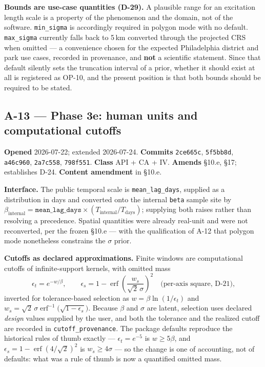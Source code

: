 \documentclass[
  10pt,
]{article}
\begin{document}
\textbf{Bounds are use-case quantities (D-29).} A plausible range for an excitation length scale is a property of the phenomenon and the domain, not of the software. \texttt{min\_sigma} is accordingly required in polygon mode with no default. \texttt{max\_sigma} currently falls back to 5\,km converted through the projected CRS when omitted --- a convenience chosen for the expected Philadelphia district and park use cases, recorded in provenance, and \textbf{not} a scientific statement. Since that default silently sets the truncation interval of a prior, whether it should exist at all is registered as OP-10, and the present position is that both bounds should be required to be stated.

\hypertarget{a-13}{%
\subsection{A-13 --- Phase 3e: human units and computational cutoffs}\label{a-13}}

\textbf{Opened} 2026-07-22; extended 2026-07-24. \textbf{Commits} \texttt{2ce665c}, \texttt{5f5bb8d}, \texttt{a46c960}, \texttt{2a7c558}, \texttt{798f551}. \textbf{Class} API + CA + IV. \textbf{Amends} §10.e, §17; establishes D-24. \textbf{Content amendment} in §10.e.

\textbf{Interface.} The public temporal scale is \texttt{mean\_lag\_days}, supplied as a distribution in days and converted onto the internal \texttt{beta} sample site by \(\beta_{\text{internal}} = \texttt{mean\_lag\_days} \times (T_{\text{internal}} / T_{\text{days}})\); supplying both raises rather than resolving a precedence. Spatial quantities were already real-unit and were not reconverted, per the frozen §10.e --- with the qualification of A-12 that polygon mode nonetheless constrains the \(\sigma\) prior.

\textbf{Cutoffs as declared approximations.} Finite windows are computational cutoffs of infinite-support kernels, with omitted mass
\[
  \epsilon_t = e^{-w/\beta},
  \qquad
  \epsilon_s = 1 - \operatorname{erf}\!\left(\frac{w_s}{\sqrt{2}\,\sigma}\right)^{\!2}
  \quad \text{(per-axis square, D-21),}
\]
inverted for tolerance-based selection as \(w = \beta \ln(1/\epsilon_t)\) and \(w_s = \sqrt{2}\,\sigma \operatorname{erf}^{-1}\!\big(\sqrt{1-\epsilon_s}\big)\). Because \(\beta\) and \(\sigma\) are latent, selection uses declared \emph{design} values supplied by the user, and both the tolerance and the realized cutoff are recorded in \texttt{cutoff\_provenance}. The package defaults reproduce the historical rules of thumb exactly --- \(\epsilon_t = e^{-5}\) is \(w \geq 5\beta\), and \(\epsilon_s = 1 - \operatorname{erf}(4/\sqrt{2})^2\) is \(w_s \geq 4\sigma\) --- so the change is one of accounting, not of defaults: what was a rule of thumb is now a quantified omitted mass.
\end{document}

